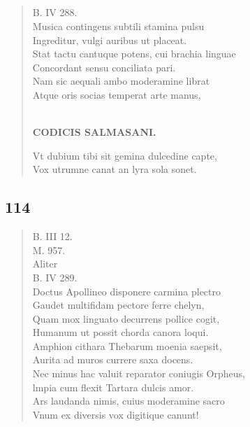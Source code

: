 \documentclass[11pt, a4paper]{report}
\begin{document}
            \subsection*{}
      \begin{verse}
      B. IV 288. \\ Musica contingens subtili stamina pulsu \\ Ingreditur, vulgi auribus ut placeat. \\ Stat tactu cantuque potens, cui brachia linguae \\ Concordant sensu conciliata pari. \\ Nam sic aequali ambo moderamine librat \\ Atque oris socias temperat arte manus, \\ 
        ﻿\pagebreak 
    \begin{center} \textbf{CODICIS SALMASANI.} \end{center}Vt dubium tibi sit gemina dulcedine capte, \\ Vox utrumne canat an lyra sola sonet. \\ 
      \end{verse}
  
            \subsection*{114}
      \begin{verse}
      B. III 12. \\ M. 957. \\ Aliter \\ B. IV 289. \\ Doctus Apollineo disponere carmina plectro \\ Gaudet multifidam pectore ferre chelyn, \\ Quam mox linguato decurrens pollice cogit, \\ Humanum ut possit chorda canora loqui. \\ Amphion cithara Thebarum moenia saepsit, \\ Aurita ad muros currere saxa docens. \\ Nec minus hac valuit reparator coniugis Orpheus, \\ lmpia cum flexit Tartara dulcis amor. \\ Ars laudanda nimis, cuius moderamine sacro \\ Vnum ex diversis vox digitique canunt! \\ 
      \end{verse}
  
\end{document}
